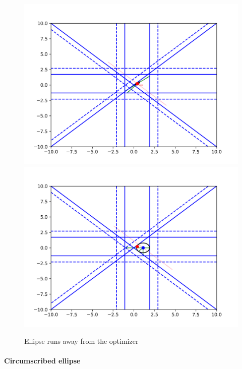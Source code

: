 \begin{figure}[ht]
    \centering
    \includegraphics[scale=0.4]{images/run_away_1.png}
    \includegraphics[scale=0.4]{images/run_away_2.png}
    \caption{
    Ellipse runs away from the optimizer}
    \label{line_can_run}
\end{figure}


\paragraph*{Circumscribed ellipse}

